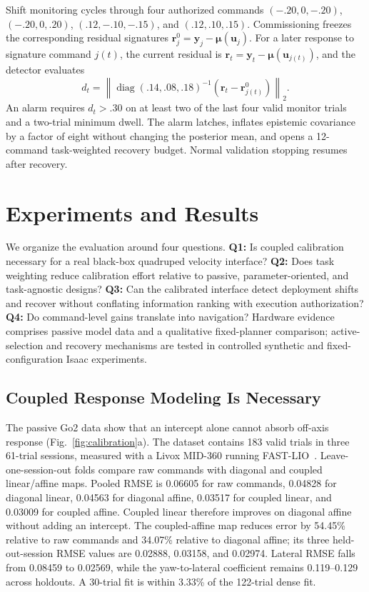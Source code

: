 \documentclass[letterpaper,10pt,conference]{ieeeconf}
\newcommand{\vect}[1]{\boldsymbol{#1}}
\begin{document}
Shift monitoring cycles through four authorized commands
$(-.20,0,-.20)$, $(-.20,0,.20)$, $(.12,-.10,-.15)$, and
$(.12,.10,.15)$. Commissioning freezes the corresponding residual signatures
$\vect{r}^{0}_{j}=\vect{y}_{j}-\vect{\mu}(\vect{u}_{j})$. For a later response
to signature command $j(t)$, the current residual is
$\vect{r}_t=\vect{y}_t-\vect{\mu}(\vect{u}_{j(t)})$, and the detector evaluates
\begin{equation}
 d_t=\left\|\operatorname{diag}(.14,.08,.18)^{-1}
 \left(\vect{r}_t-\vect{r}^{0}_{j(t)}\right)\right\|_2 .
 \label{eq:signature}
\end{equation}
An alarm requires $d_t>.30$ on at least two of the last four valid monitor
trials and a two-trial minimum dwell. The alarm latches, inflates epistemic
covariance by a factor of eight without changing the posterior mean, and opens
a 12-command task-weighted recovery budget. Normal validation stopping resumes
after recovery.

\section{Experiments and Results}

We organize the evaluation around four questions. \textbf{Q1:} Is coupled
calibration necessary for a real black-box quadruped velocity interface?
\textbf{Q2:} Does task weighting reduce calibration effort relative to passive,
parameter-oriented, and task-agnostic designs? \textbf{Q3:} Can the calibrated
interface detect deployment shifts and recover without conflating information
ranking with execution authorization? \textbf{Q4:} Do command-level gains
translate into navigation? Hardware evidence comprises passive model data and a
qualitative fixed-planner comparison; active-selection and recovery mechanisms
are tested in controlled synthetic and fixed-configuration Isaac experiments.

\subsection{Coupled Response Modeling Is Necessary}

The passive Go2 data show that an intercept alone cannot absorb off-axis
response (Fig.~\ref{fig:calibration}a). The dataset contains 183 valid trials in
three 61-trial sessions, measured with a Livox MID-360 running
FAST-LIO~\cite{xu2021fastlio}. Leave-one-session-out folds compare raw commands with diagonal and
coupled linear/affine maps. Pooled RMSE is 0.06605 for raw commands, 0.04828 for
diagonal linear, 0.04563 for diagonal affine, 0.03517 for coupled linear, and
0.03009 for coupled affine. Coupled linear therefore improves on diagonal
affine without adding an intercept. The coupled-affine map reduces error by
54.45\% relative to raw commands and 34.07\% relative to diagonal affine; its
three held-out-session RMSE values are 0.02888, 0.03158, and 0.02974. Lateral
RMSE falls from 0.08459 to 0.02569, while the yaw-to-lateral coefficient remains
0.119--0.129 across holdouts. A 30-trial fit is within 3.33\% of the 122-trial
dense fit.
\end{document}

